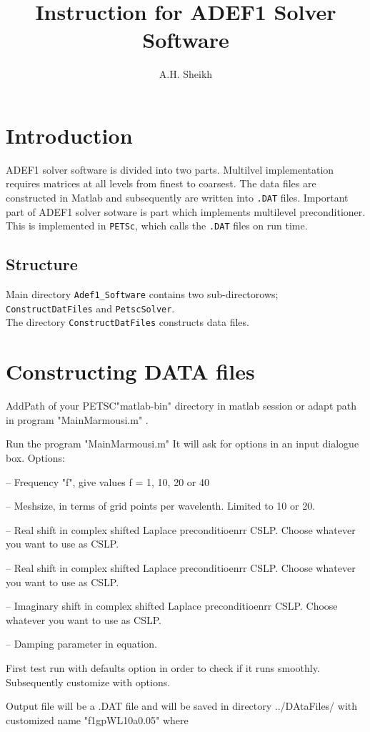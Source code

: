 \documentclass[a4paper,11pt]{article}
\author{A.H. Sheikh}
\title{Instruction for ADEF1 Solver Software}
\date{}
\begin{document}
%
\maketitle
%
\section{Introduction}
ADEF1 solver software is divided into two parts. Multilvel implementation
requires matrices at all levels from finest to coarsest. The data files are
constructed in Matlab and subsequently are written into \texttt{.DAT} files.
Important part of ADEF1 solver sotware is part which implements multilevel
preconditioner. This is implemented in \texttt{PETSc}, which calls the 
\texttt{.DAT} files on run time. 
\subsection{Structure}
Main directory  \texttt{Adef1\_Software} contains two sub-directorows;
\texttt{ConstructDatFiles} and \texttt{PetscSolver}.\\
The directory \texttt{ConstructDatFiles} constructs data files. 
\section{Constructing DATA files}
AddPath of your PETSC"matlab-bin" directory in matlab session
or adapt path in program "MainMarmousi.m" . 


Run the program "MainMarmousi.m"
It will ask for options in an input dialogue box. 
Options: 

-- 	Frequency "f", give values f = 1, 10, 20 or 40

--	Meshsize, in terms of grid points per wavelenth. Limited to 10 or 20.

--	Real shift in complex shifted Laplace preconditioenrr CSLP. Choose
whatever you want to 
	use as CSLP. 

--	Real shift in complex shifted Laplace preconditioenrr CSLP. Choose
whatever you want to 
	use as CSLP. 

--	Imaginary shift in complex shifted Laplace preconditioenrr CSLP. Choose
whatever you want to 
	use as CSLP. 

--	Damping parameter in equation. 


First test run with defaults option in order to check if it runs smoothly. 
Subsequently customize with options. 

Output file will be a .DAT file and will be saved in directory ../DAtaFiles/ 
with customized name  "f1gpWL10a0.05" where 
\end{document}
